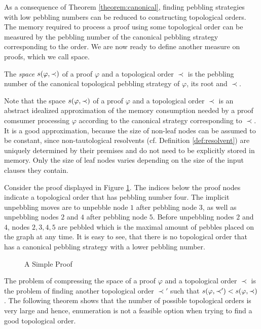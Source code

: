 As a consequence of Theorem \ref{theorem:canonical}, finding pebbling strategies with low pebbling numbers can be reduced to constructing topological orders.
The memory required to process a proof using some topological order can be measured by the pebbling number of the canonical pebbling strategy corresponding to the order.
We are now ready to define another measure on proofs, which we call space.

\begin{definition}
\label{def:space measure}
The \emph{space} $s(\varphi,\prec)$ 
of a proof $\varphi$ and a topological order $\prec$ is the pebbling number of the canonical topological pebbling strategy of $\varphi$, its root and $\prec$.
\end{definition}

Note that the space $s(\varphi,\prec)$ of a proof $\varphi$ and a topological order $\prec$ is an abstract idealized approximation of the memory consumption needed by a proof comsumer processing $\varphi$ according to the canonical strategy corresponding to $\prec$. It is a good approximation, because the size of non-leaf nodes can be assumed to be constant, since non-tautological resolvents (cf. Definition \ref{def:resolvent}) are uniquely determined by their premises and do not need to be explicitly stored in memory. Only the size of leaf nodes varies depending on the size of the input clauses they contain.


\begin{example}

Consider the proof displayed in Figure \ref{fig:spaceproof}.
The indices below the proof nodes indicate a topological order that has pebbling number four.
The implicit unpebbling moves are to unpebble node $1$ after pebbling node $3$, as well as unpebbling nodes $2$ and $4$ after pebbling node $5$.
Before unpebbling nodes $2$ and $4$, nodes $2,3,4,5$ are pebbled which is the maximal amount of pebbles placed on the graph at any time.
It is easy to see, that there is no topological order that has a canonical pebbling strategy with a lower pebbling number.

\begin{figure}[!h]

\caption{A Simple Proof}
\label{fig:spaceproof}
\end{figure}

\end{example}

The problem of compressing the space of a proof $\varphi$ and a topological order $\prec$ is the problem of finding another topological order $\prec'$ such that $s(\varphi,\prec') < s(\varphi,\prec)$. The following theorem shows that the number of possible topological orders is very large and hence, enumeration is not a feasible option when trying to find a good topological order.

